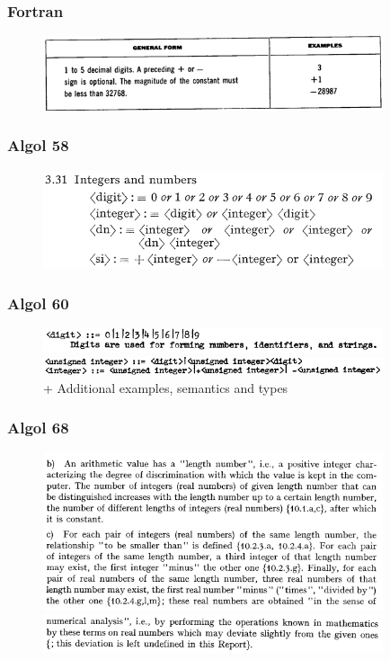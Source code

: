 \documentclass{beamer}
\begin{document}
\begin{frame}
	\frametitle{Fortran}
	
	\begin{figure}
		\includegraphics[width=10cm]{FORTRAN_Example}
	\end{figure}
	
\end{frame}

\begin{frame}
	\frametitle{Algol 58}
	
	\begin{figure}
		\includegraphics[width=10cm]{ALGOL58_Example}
	\end{figure}
	
\end{frame}

\begin{frame}
	\frametitle{Algol 60}
	
	\begin{figure}
		\includegraphics[width=10cm]{ALGOL60_Example2}
		\includegraphics[width=10cm]{ALGOL60_Example} \\
		+ Additional examples, semantics and types
	\end{figure}
	
\end{frame}

\begin{frame}
	\frametitle{Algol 68}
	
	\begin{figure}
		\includegraphics[width=10cm]{ALGOL68_Example}
		\includegraphics[width=10cm]{ALGOL68_Example2}
	\end{figure}
	
\end{frame}
\end{document}
